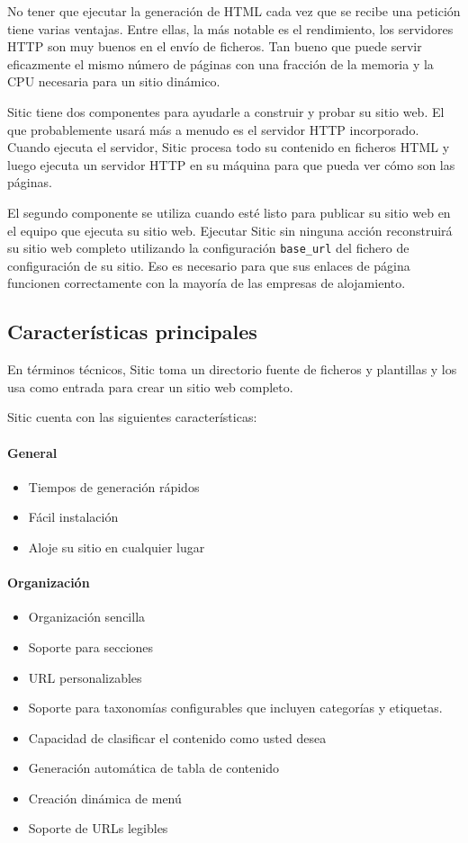No tener que ejecutar la generación de HTML cada vez que se recibe una petición tiene varias ventajas. Entre ellas,
la más notable es el rendimiento, los servidores HTTP son muy buenos en el envío de ficheros. Tan bueno que puede
servir eficazmente el mismo número de páginas con una fracción de la memoria y la CPU necesaria para un sitio dinámico.

Sitic tiene dos componentes para ayudarle a construir y probar su sitio web. El que probablemente usará más a menudo es el
servidor HTTP incorporado. Cuando ejecuta el servidor, Sitic procesa todo su contenido en ficheros HTML y luego ejecuta
un servidor HTTP en su máquina para que pueda ver cómo son las páginas.

El segundo componente se utiliza cuando esté listo para publicar su sitio web en el equipo que ejecuta su sitio web.
Ejecutar Sitic sin ninguna acción reconstruirá su sitio web completo utilizando la configuración \texttt{base\_url} del fichero de
configuración de su sitio. Eso es necesario para que sus enlaces de página funcionen correctamente con la mayoría
de las empresas de alojamiento.

\subsection{Características principales}

En términos técnicos, Sitic toma un directorio fuente de ficheros y plantillas y los usa como entrada para crear un sitio web completo.

Sitic cuenta con las siguientes características:

\paragraph{General}

\begin{itemize}
\item Tiempos de generación rápidos
\item Fácil instalación
\item Aloje su sitio en cualquier lugar
\end{itemize}

\paragraph{Organización}

\begin{itemize}
\item Organización sencilla
\item Soporte para secciones
\item URL personalizables
\item Soporte para taxonomías configurables que incluyen categorías y etiquetas.
\item Capacidad de clasificar el contenido como usted desea
\item Generación automática de tabla de contenido
\item Creación dinámica de menú
\item Soporte de URLs legibles
\end{itemize}

